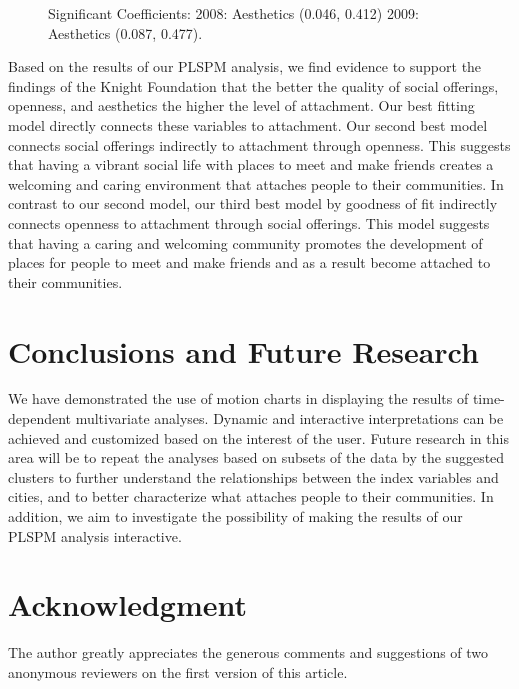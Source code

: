 \documentclass[11pt]{asaproc}
\begin{document}
\begin{figure}[H]
\begin{framed}
\begin{minipage}[b]{0.45\linewidth}
\end{minipage}
\hspace{0.5cm}
\begin{minipage}[b]{0.45\linewidth}
\centering
\caption{Significant Coefficients: 
2008: Aesthetics (0.046, 0.412)
2009: Aesthetics (0.087, 0.477).}
\label{fig:PLSPMmodel11}
\end{minipage}
\end{framed}
\end{figure}

Based on the results of our PLSPM analysis, we find evidence to
support the findings of the Knight Foundation that the better the
quality of social offerings, openness, and aesthetics the higher the
level of attachment. Our best fitting model directly connects these
variables to attachment. Our second best model connects social
offerings indirectly to attachment through openness. This suggests
that having a vibrant social life with places to meet and make friends
creates a welcoming and caring environment that attaches people to
their communities. In contrast to our second model, our third best
model by goodness of fit indirectly connects openness to attachment
through social offerings. This model suggests that having a caring and
welcoming community promotes the development of places for people to
meet and make friends and as a result become attached to their
communities. 

\section{Conclusions and Future Research}
We have demonstrated the use of motion charts in displaying the results
of time-dependent multivariate analyses. Dynamic and interactive
interpretations can be achieved and customized based on the interest of
the user. Future research in this area will be to repeat the analyses
based on subsets of the data by the suggested clusters to further
understand the relationships between the index variables and cities, and
to better characterize what attaches people to their communities. In
addition, we aim to investigate the possibility of making the results
of our PLSPM analysis interactive.

\section{Acknowledgment}
The author greatly appreciates the generous comments and suggestions
of two anonymous reviewers on the first version of this article.
\end{document}
